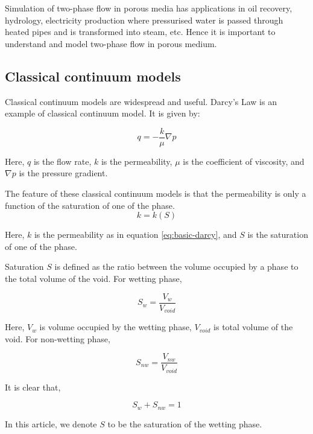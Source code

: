 Simulation of two-phase flow in porous media has applications in oil recovery, hydrology, electricity production where pressurised water is passed through heated pipes and is transformed into steam, etc. Hence it is important to understand and model two-phase flow in porous medium. \cite{labed2012experimental}
	
\subsection{Classical continuum models}

	Classical continuum models are widespread and useful. Darcy's Law is an example of classical continuum model. It is given by:
	
	\begin{equation}
		q = -\frac{k}{\mu} \nabla p
		\label{eq:basic-darcy}
	\end{equation}
	
	Here, $q$ is the flow rate,	$k$ is the permeability, $\mu$ is the coefficient of viscosity,	and $\nabla p$ is the pressure gradient.
	
	The feature of these classical continuum models is that the permeability is only a function of the saturation of one of the phase.
	\begin{equation}
		k = k(S)
	\end{equation}
	
	Here, $k$ is the permeability as in equation \ref{eq:basic-darcy}, and $S$ is the saturation of one of the phase.

	Saturation $S$ is defined as the ratio between the volume occupied by a phase to the total volume of the void. For wetting phase,

	\begin{equation}
		S_{w} = \frac{V_{w}}{V_{void}}
	\end{equation}
	
	Here, $V_{w}$ is volume occupied by the wetting phase, $V_{void}$ is total volume of the void. For non-wetting phase,
	
	\begin{equation}
		S_{nw} = \frac{V_{nw}}{V_{void}}
	\end{equation}
	
	It is clear that,
	
	\begin{equation}
		S_{w} + S_{nw} = 1
	\end{equation}
	
	In this article, we denote $S$ to be the saturation of the wetting phase.
	
